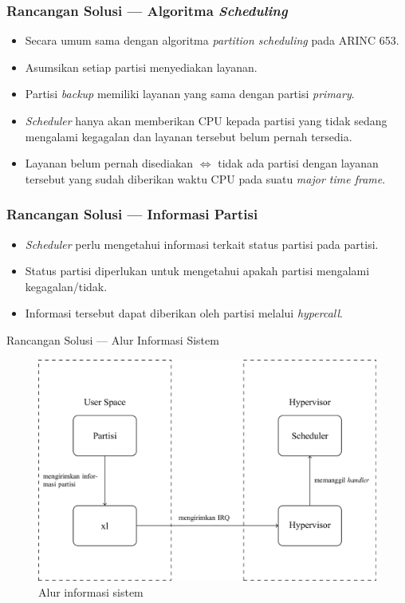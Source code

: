 \documentclass[xetex]{beamer}
\begin{document}
\begin{frame}
	\frametitle{Rancangan Solusi --- Algoritma \textit{Scheduling}}
	\begin{itemize}
		\item Secara umum sama dengan algoritma \textit{partition scheduling} pada ARINC 653.
		\item Asumsikan setiap partisi menyediakan layanan.
		\item Partisi \textit{backup} memiliki layanan yang sama dengan partisi \textit{primary}.
		\item \textit{Scheduler} hanya akan memberikan CPU kepada
			partisi yang tidak sedang mengalami kegagalan
			dan layanan tersebut belum pernah tersedia.
		\item Layanan belum pernah disediakan
			$\Longleftrightarrow$ tidak ada partisi dengan layanan
			tersebut yang sudah diberikan waktu CPU pada suatu
			\textit{major time frame}.
	\end{itemize}
\end{frame}
\begin{frame}
	\frametitle{Rancangan Solusi --- Informasi Partisi}
	\begin{itemize}
		\item \textit{Scheduler} perlu mengetahui informasi terkait status partisi pada partisi.
		\item Status partisi diperlukan untuk mengetahui apakah partisi mengalami kegagalan/tidak.
		\item Informasi tersebut dapat diberikan oleh partisi melalui \textit{hypercall}.
	\end{itemize}
\end{frame}
\begin{frame}{Rancangan Solusi --- Alur Informasi Sistem}
	\centering
	\begin{figure}
		\includegraphics[scale=0.23]{./final-project-figure1.png}
		\caption{Alur informasi sistem}
	\end{figure}
\end{frame}
\end{document}
